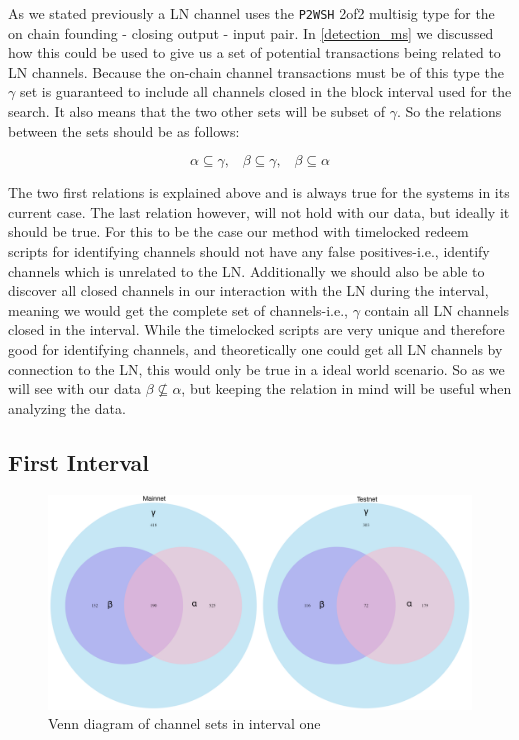 As we stated previously a LN channel uses the {\tt P2WSH} 2of2 multisig type for the on chain founding - closing output - input pair. In \cref{detection_ms} we discussed how this could be used to give us a set of potential transactions being related to LN channels. Because the on-chain channel transactions must be of this type the \( \gamma \) set is guaranteed to include all channels closed in the block interval used for the search. It also means that the two other sets will be subset of \( \gamma \). So the relations between the sets should be as follows:

\begin{equation} \label{eq:1}
      \alpha \subseteq \gamma, \hspace{10pt} \beta \subseteq \gamma, \hspace{10pt} \beta \subseteq \alpha  
\end{equation}

The two first relations is explained above and is always true for the systems in its current case. The last relation however, will not hold with our data, but ideally it should be true. For this to be the case our method with timelocked redeem scripts for identifying channels should not have any false positives-i.e., identify channels which is unrelated to the LN. Additionally we should also be able to discover all closed channels in our interaction with the LN during the interval, meaning we would get the complete set of channels-i.e., \( \gamma \) contain all LN channels closed in the interval. While the timelocked scripts are very unique and therefore good for identifying channels, and theoretically one could get all LN channels by connection to the LN, this would only be true in a ideal world scenario. So as we will see with our data \( \beta \not\subseteq \alpha \), but keeping the relation in mind will be useful when analyzing the data.

\subsection{First Interval}

\begin{figure}[ht]
    \centering
    \includegraphics[width=16cm]{figures/graphs/venn_full.png}
    \caption{Venn diagram of channel sets in interval one}
    \label{fig:venn_run1}
\end{figure}

